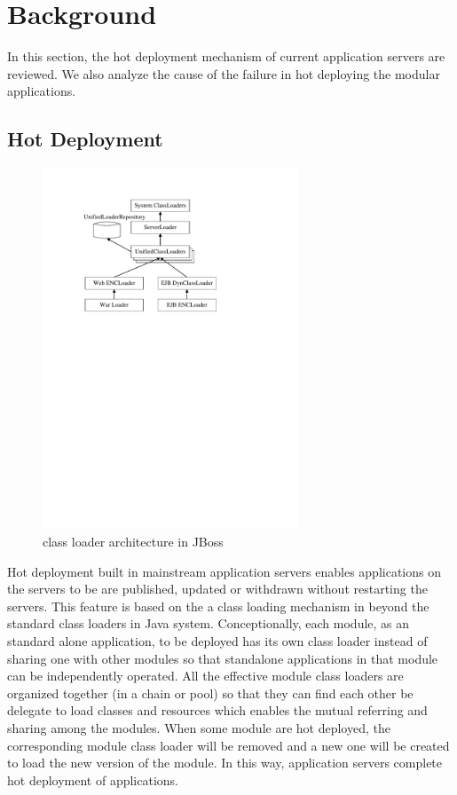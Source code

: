 \documentclass[conference]{IEEEtran}
\begin{document}
\section{Background\label{sec:background}}
In this section, the hot deployment mechanism of current application servers are reviewed. We also analyze  the cause of the failure in hot deploying the modular applications.

\subsection{Hot Deployment}

\begin{figure}[!t]
\centering
\includegraphics[width=3.0in]{JBossClassLoader.pdf}
\caption{class loader architecture in JBoss}
\label{fig:jboss_class_loader}
\end{figure}

Hot deployment built in mainstream application servers enables applications on the servers to be are published, updated or withdrawn without restarting the servers. This feature is based on the a class loading mechanism in  beyond the standard class loaders in Java system. Conceptionally, each module, as an standard alone application, to be deployed has its own class loader instead of sharing one with other modules so that standalone applications in that module can be independently operated. All the effective module class loaders are organized together (in a chain or pool) so that they can find each other be delegate to load classes and resources which enables the mutual referring and sharing among the modules. When some module are hot deployed, the corresponding module class loader will be removed and a new one will be created to load the new version of the module. In this way, application servers complete hot deployment of applications\cite{module_cl}.
\end{document}
